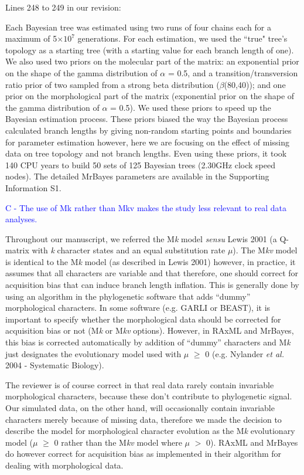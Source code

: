 \documentclass[11pt]{letter}
\begin{document}
\begin{letter}{}
Lines 248 to 249 in our revision:

\hfill\begin{minipage}{\dimexpr\textwidth-1cm}
Each Bayesian tree was estimated using two runs of four chains each for a maximum of 5$\times$$10^7$ generations. For each estimation, we used the ``true" tree's topology as a starting tree (with a starting value for each branch length of one). We also used two priors on the molecular part of the matrix: an exponential prior on the shape of the gamma distribution of $\alpha$ = 0.5, and a transition/transversion ratio prior of two sampled from a strong beta distribution ($\beta$(80,40)); and one prior on the morphological part of the matrix (exponential prior on the shape of the gamma distribution of $\alpha$ = 0.5). We used these priors to speed up the Bayesian estimation process. These priors biased the way the Bayesian process calculated branch lengths by giving non-random starting points and boundaries for parameter estimation however, here we are focusing on the effect of missing data on tree topology and not branch lengths. Even using these priors, it took $~$ 140 CPU years to build 50 sets of 125 Bayesian trees (2.30GHz clock speed nodes). The detailed MrBayes parameters are available in the Supporting Information S1.
\end{minipage}

\textcolor{blue}{C - The use of Mk rather than Mkv makes the study less relevant to real data analyses.}

Throughout our manuscript, we referred the M\textit{k} model \textit{sensu} Lewis 2001 (a Q-matrix with \textit{k} character states and an equal substitution rate $\mu$). The M\textit{kv} model is identical to the M\textit{k} model (as described in Lewis 2001) however, in practice, it assumes that all characters are variable and that therefore, one should correct for acquisition bias that can induce branch length inflation. This is generally done by using an algorithm in the phylogenetic software that adds ``dummy'' morphological characters. In some software (e.g. GARLI or BEAST), it is important to specify whether the morphological data should be corrected for acquisition bias or not (M\textit{k} or M\textit{kv} options). However, in RAxML and MrBayes, this bias is corrected automatically by addition of ``dummy'' characters and M\textit{k} just designates the evolutionary model used with $\mu$ $\geq$ 0 (e.g. Nylander \textit{et al.} 2004 - Systematic Biology). 

The reviewer is of course correct in that real data rarely contain invariable morphological characters, because these don't contribute to phylogenetic signal. Our simulated data, on the other hand, will occasionally contain invariable characters merely because of missing data, therefore we made the decision to describe the model for morphological character evolution as the M\textit{k} evolutionary model ($\mu$ $\geq$ 0 rather than the M\textit{kv} model where $\mu$ $>$ 0). RAxML and MrBayes do however correct for acquisition bias as implemented in their algorithm for dealing with morphological data.


\end{letter}
\end{document}
